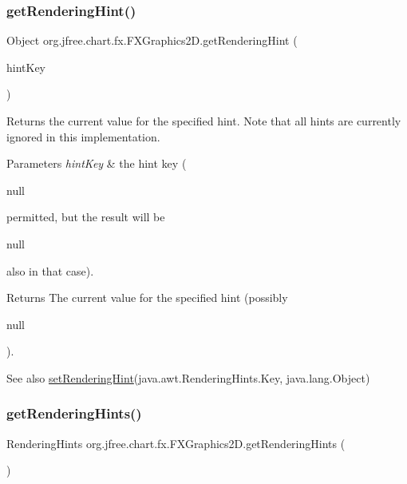 \subsubsection{\texorpdfstring{get\+Rendering\+Hint()}{getRenderingHint()}}
{\footnotesize\ttfamily Object org.\+jfree.\+chart.\+fx.\+F\+X\+Graphics2\+D.\+get\+Rendering\+Hint (\begin{DoxyParamCaption}\item[{Rendering\+Hints.\+Key}]{hint\+Key }\end{DoxyParamCaption})}

Returns the current value for the specified hint. Note that all hints are currently ignored in this implementation.


\begin{DoxyParams}{Parameters}
{\em hint\+Key} & the hint key (
\begin{DoxyCode}
null 
\end{DoxyCode}
 permitted, but the result will be
\begin{DoxyCode}
null 
\end{DoxyCode}
 also in that case).\\
\hline
\end{DoxyParams}
\begin{DoxyReturn}{Returns}
The current value for the specified hint (possibly
\begin{DoxyCode}
null 
\end{DoxyCode}
 ).
\end{DoxyReturn}
\begin{DoxySeeAlso}{See also}
\mbox{\hyperlink{classorg_1_1jfree_1_1chart_1_1fx_1_1_f_x_graphics2_d_a727f4c6a3f846b60dd33bfd933e3c812}{set\+Rendering\+Hint}}(java.\+awt.\+Rendering\+Hints.\+Key, java.\+lang.\+Object) 
\end{DoxySeeAlso}
\mbox{\label{classorg_1_1jfree_1_1chart_1_1fx_1_1_f_x_graphics2_d_a55636a4088737a9c9d29655b315d8085}} 
\subsubsection{\texorpdfstring{get\+Rendering\+Hints()}{getRenderingHints()}}
{\footnotesize\ttfamily Rendering\+Hints org.\+jfree.\+chart.\+fx.\+F\+X\+Graphics2\+D.\+get\+Rendering\+Hints (\begin{DoxyParamCaption}{ }\end{DoxyParamCaption})}

